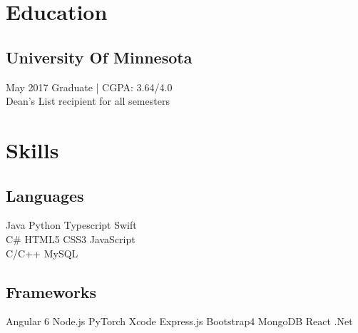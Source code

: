 \documentclass[]{rinkal_resume}
\begin{document}
%
%


%
%

\begin{minipage}[t]{0.30\textwidth} 


\section{Education} 

\subsection{University Of Minnesota}
\small May 2017  Graduate | CGPA: 3.64/4.0 \\
\small Dean's List recipient for all semesters
\sectionsep


\section{Skills}
\subsection{Languages}
\vspace{1pt}
Java \textbullet{} 
Python \textbullet{}
Typescript \textbullet{}
Swift \textbullet{} \\
C\# \textbullet{} 
HTML5 \textbullet{}
CSS3 \textbullet{}
JavaScript \textbullet{} \\
C/C++ \textbullet{}
MySQL %
\sectionsep

\vspace{1pt}
\subsection{Frameworks}
\vspace{1pt}
Angular 6 \textbullet{}
Node.js \textbullet{}
PyTorch \textbullet{}
Xcode \textbullet{}
Express.js \textbullet{}
Bootstrap4 \textbullet{}
MongoDB \textbullet{}
React \textbullet{}
.Net 
\sectionsep


\end{minipage}
\end{document}
